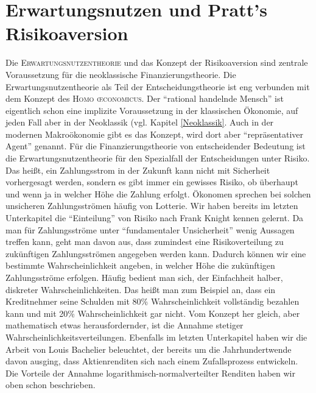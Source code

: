 \section{Erwartungsnutzen und Pratt's Risikoaversion}
\label{Erwartungsnutzen}
Die \textsc{Erwartungsnutzentheorie} und das Konzept der Risikoaversion sind zentrale Voraussetzung für die neoklassische Finanzierungstheorie. Die Erwartungsnutzentheorie als Teil der Entscheidungstheorie ist eng verbunden mit dem Konzept des \textsc{Homo \oe conomicus}. Der "`rational handelnde Mensch"' ist eigentlich schon eine implizite Voraussetzung in der klassischen Ökonomie, auf jeden Fall aber in der Neoklassik (vgl. Kapitel \ref{Neoklassik}. Auch in der modernen Makroökonomie gibt es das Konzept, wird dort aber "`repräsentativer Agent"' genannt. Für die Finanzierungstheorie von entscheidender Bedeutung ist die Erwartungsnutzentheorie für den Spezialfall der Entscheidungen unter Risiko. Das heißt, ein Zahlungsstrom in der Zukunft kann nicht mit Sicherheit vorhergesagt werden, sondern es gibt immer ein gewisses Risiko, ob überhaupt und wenn ja in welcher Höhe die Zahlung erfolgt. Ökonomen sprechen bei solchen unsicheren Zahlungsströmen häufig von Lotterie. Wir haben bereits im letzten Unterkapitel die "`Einteilung"' von Risiko nach Frank Knight kennen gelernt. Da man für Zahlungsströme unter "`fundamentaler Unsicherheit"' wenig Aussagen treffen kann, geht man davon aus, dass zumindest eine Risikoverteilung zu zukünftigen Zahlungsströmen angegeben werden kann. Dadurch können wir eine bestimmte Wahrscheinlichkeit angeben, in welcher Höhe die zukünftigen Zahlungsströme erfolgen. Häufig bedient man sich, der Einfachheit halber, diskreter Wahrscheinlichkeiten. Das heißt man zum Beispiel an, dass ein Kreditnehmer seine Schulden mit 80\% Wahrscheinlichkeit vollständig bezahlen kann und mit 20\% Wahrscheinlichkeit gar nicht. Vom Konzept her gleich, aber mathematisch etwas herausfordernder, ist die Annahme stetiger Wahrscheinlichkeitsverteilungen. Ebenfalls im letzten Unterkapitel haben wir die Arbeit von Louis Bachelier beleuchtet, der bereits um die Jahrhundertwende davon ausging, dass Aktienrenditen sich nach einem Zufallsprozess entwickeln. Die Vorteile der Annahme logarithmisch-normalverteilter Renditen haben wir oben schon beschrieben. 

